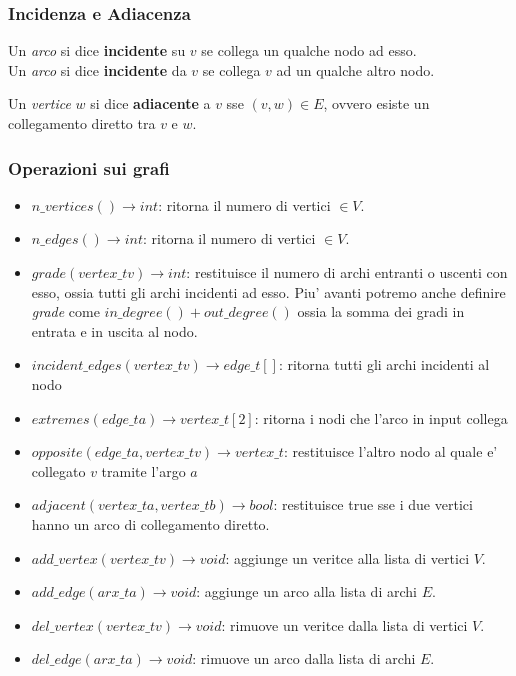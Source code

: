 \documentclass{article}
\begin{document}
\subsubsection{Incidenza e Adiacenza}

Un \emph{arco} si dice \textbf{incidente} su $v$ se collega un qualche nodo ad esso. \\
Un \emph{arco} si dice \textbf{incidente} da $v$ se collega $v$ ad un qualche altro nodo.

Un \emph{vertice} $w$ si dice \textbf{adiacente} a $v$ sse $(v, w) \in E$,
ovvero esiste un collegamento diretto tra $v$ e $w$.

\subsubsection{Operazioni sui grafi}

\begin{itemize}
  \item $n\_vertices() \rightarrow int$: ritorna il numero di vertici $\in V$.
  \item $n\_edges() \rightarrow int$: ritorna il numero di vertici $\in V$.
  \item $grade(vertex\_t v) \rightarrow int$: restituisce il numero di archi
    entranti o uscenti con esso, ossia tutti gli archi incidenti ad esso. Piu'
    avanti potremo anche definire \emph{grade} come $in\_degree() + out\_degree()$
    ossia la somma dei gradi in entrata e in uscita al nodo.
  \item $incident\_edges(vertex\_t v) \rightarrow edge\_t[]$: ritorna tutti
    gli archi incidenti al nodo
  \item $extremes(edge\_t a) \rightarrow vertex\_t[2]$: ritorna i nodi che
    l'arco in input collega
  \item $opposite(edge\_t a, vertex\_t v) \rightarrow vertex\_t$: restituisce
    l'altro nodo al quale e' collegato $v$ tramite l'argo $a$
  \item $adjacent(vertex\_t a, vertex\_t b) \rightarrow bool$: restituisce
    true sse i due vertici hanno un arco di collegamento diretto.
  \item $add\_vertex(vertex\_t v) \rightarrow void$: aggiunge un veritce
    alla lista di vertici $V$.
  \item $add\_edge(arx\_t a) \rightarrow void$: aggiunge un arco alla lista
    di archi $E$.
  \item $del\_vertex(vertex\_t v) \rightarrow void$: rimuove un veritce
    dalla lista di vertici $V$.
  \item $del\_edge(arx\_t a) \rightarrow void$: rimuove un arco dalla lista
    di archi $E$.
\end{itemize}
\end{document}
